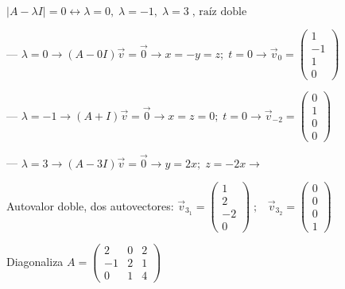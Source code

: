 \begin{proofw}\renewcommand{\qedsymbol}{$\diamond$}
	$|A-\lambda I|=0 \leftrightarrow \lambda =0,\; \lambda =-1, \; \lambda=3 \; \text{, raíz doble }$
	
\noindent --- $\lambda = 0 \to (A-0I)\vec v=\vec 0 \to x=-y=z; \; t=0 \to \vec v_{0}= \left( \begin{matrix} 1\\-1\\1\\0 \end{matrix} \right)$

\noindent --- $\lambda = -1 \to (A+I)\vec v=\vec 0 \to x=z=0; \; t=0 \to \vec v_{-2}= \left( \begin{matrix} 0\\1\\0\\0 \end{matrix} \right)$

\noindent --- $\lambda = 3 \to (A-3I)\vec v=\vec 0 \to y=2x; \; z=-2x \to $

\noindent Autovalor doble, dos autovectores: $\vec v_{3_1}= \left( \begin{matrix} 1\\2\\-2\\0 \end{matrix} \right)\;; \; \;\;  \vec v_{3_2}= \left( \begin{matrix} 0\\0\\0\\1 \end{matrix} \right)$
\end{proofw}


\begin{ejre}
	Diagonaliza $A=\left(\begin{matrix} 2&0&2\\-1&2&1\\0&1&4  \end{matrix}\right)$
\end{ejre}

